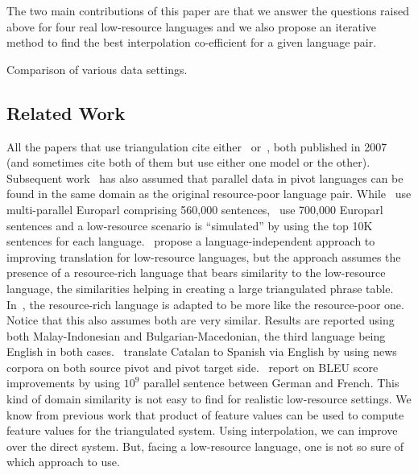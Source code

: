 \documentclass[11pt]{article}
\begin{document}
The two main contributions of this paper are that we answer the questions raised above for four real low-resource languages and we also propose an iterative method to find the best interpolation co-efficient for a given language pair. 



\begin{table}[!ht]
	\footnotesize
	\small
	\centering
	
	\caption{Comparison of various data settings.}
	\label{table:datasettings_differences}
\end{table}

\subsection{Related Work}
	All the papers that use triangulation cite either~\cite{Utiyama:07} or~\cite{Cohn:07}, both published in 2007 (and sometimes cite both of them but use either one model or the other). Subsequent work~\cite{Nakov:12,Nakovemnlp:12,Gispert:06,Huck:12} has also assumed that parallel data in pivot languages can be found in the same domain as the original resource-poor language pair. While~\cite{Utiyama:07} use multi-parallel Europarl comprising 560,000 sentences,~\cite{Cohn:07} use 700,000 Europarl sentences and a low-resource scenario is ``simulated'' by using the top 10K sentences for each language.~\cite{Nakov:12} propose a language-independent approach to improving translation for low-resource languages, but the approach assumes the presence of a resource-rich language that bears similarity to the low-resource language, the similarities helping in creating a large triangulated phrase table. In~\cite{Nakovemnlp:12}, the resource-rich language is adapted to be more like the resource-poor one. Notice that this also assumes both are very similar. Results are reported using both Malay-Indonesian and Bulgarian-Macedonian, the third language being English in both cases.~\cite{Gispert:06} translate Catalan to Spanish via English by using news corpora on both source pivot and pivot target side.~\cite{Huck:12} report on BLEU score improvements by using $10^9$ parallel sentence between German and French. This kind of domain similarity is not easy to find for realistic low-resource settings. We know from previous work that product of feature values can be used to compute feature values for the triangulated system. Using interpolation, we can improve over the direct system. But, facing a low-resource language, one is not so sure of which approach to use. 
\end{document}
